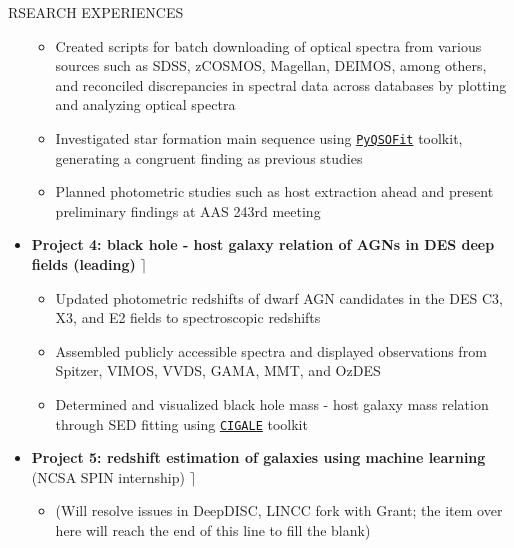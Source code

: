 \documentclass[10pt]{article} %
\DeclareRobustCommand{\yichen}[1]{#1}
\begin{document}
\begin{section}{RSEARCH EXPERIENCES}
\begin{itemize}[leftmargin=1.5em]
\begin{itemize}[leftmargin=1.5em]
        \item Created scripts for batch downloading of optical spectra from various sources such as SDSS, zCOSMOS, Magellan, DEIMOS, among others, and reconciled discrepancies in spectral data across databases by plotting and analyzing optical spectra
        \item Investigated star formation main sequence using \href{https://github.com/legolason/PyQSOFit}{\texttt{PyQSOFit}} toolkit, generating a congruent finding as previous studies
        \item Planned photometric studies such as host extraction ahead and present preliminary findings at AAS 243rd meeting 
    \end{itemize}
    \item \yichen{\textbf{Project 4: black hole - host galaxy relation of AGNs in DES deep fields (leading)} \hfill $\rceil$} %
    \begin{itemize}[leftmargin=1.5em]
        \item \yichen{Updated photometric redshifts of dwarf AGN candidates in the DES C3, X3, and E2 fields to spectroscopic redshifts}
        \item \yichen{Assembled publicly accessible spectra and displayed observations from Spitzer, VIMOS, VVDS, GAMA, MMT, and OzDES}
        \item \yichen{Determined and visualized black hole mass - host galaxy mass relation through SED fitting} using \href{https://cigale.lam.fr/}{\texttt{CIGALE}} toolkit
    \end{itemize}
    \item \yichen{\textbf{Project 5: redshift estimation of galaxies using machine learning} (NCSA SPIN internship) \hfill $\rceil$} %
    \begin{itemize}[leftmargin=1.5em]
        \item \yichen{(Will resolve issues in DeepDISC, LINCC fork with Grant; the item over here will reach the end of this line to fill the blank)}
    \end{itemize}
\end{itemize}


\end{section}
\end{document}
